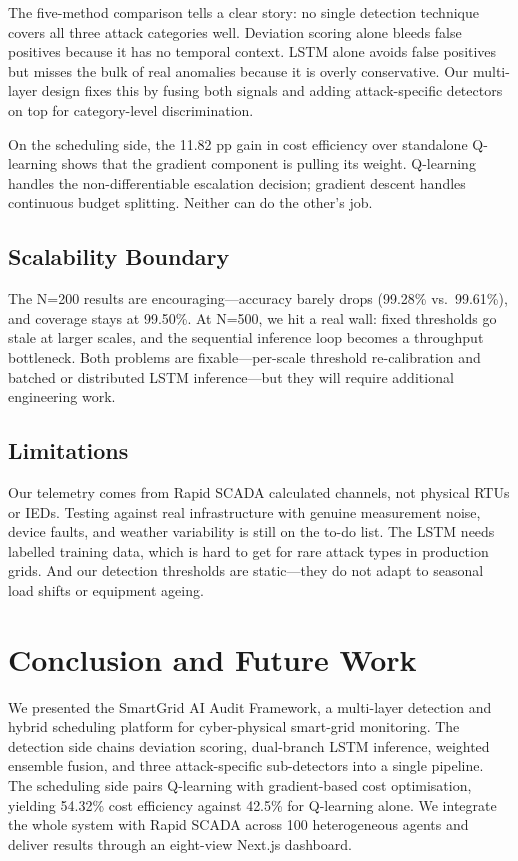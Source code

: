 \documentclass[conference]{IEEEtran}
\begin{document}
The five-method comparison tells a clear story: no single detection technique covers all three attack categories well. Deviation scoring alone bleeds false positives because it has no temporal context. LSTM alone avoids false positives but misses the bulk of real anomalies because it is overly conservative. Our multi-layer design fixes this by fusing both signals and adding attack-specific detectors on top for category-level discrimination.

On the scheduling side, the 11.82 pp gain in cost efficiency over standalone Q-learning shows that the gradient component is pulling its weight. Q-learning handles the non-differentiable escalation decision; gradient descent handles continuous budget splitting. Neither can do the other's job.

\subsection{Scalability Boundary}

The N=200 results are encouraging---accuracy barely drops (99.28\% vs.\ 99.61\%), and coverage stays at 99.50\%. At N=500, we hit a real wall: fixed thresholds go stale at larger scales, and the sequential inference loop becomes a throughput bottleneck. Both problems are fixable---per-scale threshold re-calibration and batched or distributed LSTM inference---but they will require additional engineering work.

\subsection{Limitations}

Our telemetry comes from Rapid SCADA calculated channels, not physical RTUs or IEDs. Testing against real infrastructure with genuine measurement noise, device faults, and weather variability is still on the to-do list. The LSTM needs labelled training data, which is hard to get for rare attack types in production grids. And our detection thresholds are static---they do not adapt to seasonal load shifts or equipment ageing.

\section{Conclusion and Future Work}

We presented the SmartGrid AI Audit Framework, a multi-layer detection and hybrid scheduling platform for cyber-physical smart-grid monitoring. The detection side chains deviation scoring, dual-branch LSTM inference, weighted ensemble fusion, and three attack-specific sub-detectors into a single pipeline. The scheduling side pairs Q-learning with gradient-based cost optimisation, yielding 54.32\% cost efficiency against 42.5\% for Q-learning alone. We integrate the whole system with Rapid SCADA across 100 heterogeneous agents and deliver results through an eight-view Next.js dashboard.
\end{document}
